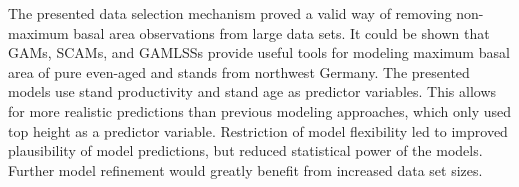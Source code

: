 The presented data selection mechanism proved a valid way of removing non-maximum basal area observations from large data sets.
It could be shown that GAMs, SCAMs, and GAMLSSs provide useful tools for modeling maximum basal area of pure even-aged \Beech{} and \Spruce{} stands from northwest Germany.
The presented models use stand productivity and stand age as predictor variables.
This allows for more realistic predictions than previous modeling approaches, which only used top height as a predictor variable.
Restriction of model flexibility led to improved plausibility of model predictions, but reduced statistical power of the models.  
Further model refinement would greatly benefit from increased data set sizes.

